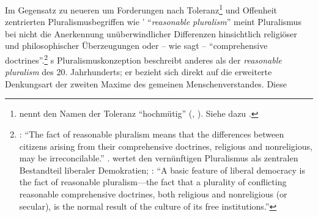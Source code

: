 \begin{comment}
begnügen, einen \emph{modus vivendi} zur friedlichen Koexistenz verschiedener Gruppen auszuhandeln. Stattdessen erweist
sich die Vernünftigkeit der beteiligten Überzeugungen selbst erst im
Versuch ihrer Mitteilung, also der Überzeugung anderer. Auch die von uns
verfolgten Ziele sind dabei Gegenstand vernünftiger Erwägung und damit der
Mitteilbarkeit zugänglich.\footnote{Ich werde später zeigen, inwiefern
\name[Immanuel]{Kant} dennoch der Tatsache Rechnung trägt, dass es eine
Vielfalt an unterschiedlichen Präferenzen gibt, die je individuell zu verfolgen
ebenso zu unseren vernünftigen Rechten gehört. Das schließt nicht aus, dass wir
sie als vernünftig oder unvernünftig bewerten können und dass dies auch auf der
Möglichkeit der Kommunikation mit anderen beruht. Siehe dazu die Überlegungen
zur \enquote{Klugheit} in Kapitel \ref{subsection:aufklaerungundpraxis}.}
\end{comment}
Im Gegensatz zu neueren um Forderungen nach
Toleranz\footnote{ nennt den Namen der Toleranz
\enquote{hochmütig}
\mkbibparens{\cite[][A 491]{Kant:BeantwortungderFrage:WasistAufklaerung?1977},
\cite[][VIII: 40.30]{Kant:GesammelteWerke1900ff.}}. Siehe dazu
\cite{Weidemann:VonenquotebisweilenunvermeidlicherGeringschaetzung2010}.} und
Offenheit zentrierten Pluralismusbegriffen wie
' \enquote{\emph{reasonable pluralism}} meint Pluralismus bei
 nicht die Anerkennung unüberwindlicher Differenzen
hinsichtlich religiöser und philosophischer Überzeugungen oder -- wie
 sagt -- \enquote{comprehensive
doctrines}.\footnote{\cite[Vgl.][136]{Rawls:TheLawofPeoples1999}: \enquote{The
fact of reasonable pluralism {\punkt} means that the differences between
citizens arising from their comprehensive doctrines, religious and nonreligious,
may be irreconcilable.} \cite[Siehe auch][\pno~11, 12, 31, 124,
131\,f.]{Rawls:TheLawofPeoples1999}.
 wertet den vernünftigen Pluralismus als zentralen
Bestandteil liberaler Demokratien; \cite[vgl.][124]{Rawls:TheLawofPeoples1999}: \enquote{A
basic feature of liberal democracy is the fact of reasonable pluralism---the
fact that a plurality of conflicting reasonable comprehensive doctrines, both
religious and nonreligious (or secular), is the normal result of the culture of
its free institutions.}} s Pluralismuskonzeption beschreibt
anderes als der \emph{reasonable pluralism} des 20. Jahrhunderts; er bezieht sich direkt auf die
erweiterte Denkungsart der zweiten Maxime des gemeinen Menschenverstandes. Diese
